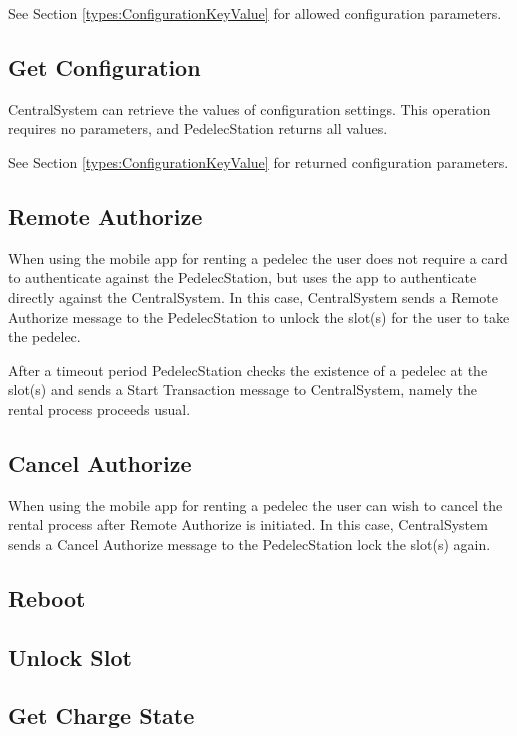  See Section \ref{types:ConfigurationKeyValue} for allowed configuration parameters.

\subsection{Get Configuration}

CentralSystem can retrieve the values of configuration settings. This operation requires no parameters, and PedelecStation returns all values.

 See Section \ref{types:ConfigurationKeyValue} for returned configuration parameters.

\subsection{Remote Authorize}

When using the mobile app for renting a pedelec the user does not require a card to authenticate against the PedelecStation, but uses the app to authenticate directly against the CentralSystem. In this case, CentralSystem sends a Remote Authorize message to the PedelecStation to unlock the slot(s) for the user to take the pedelec. 

After a timeout period PedelecStation checks the existence of a pedelec at the slot(s) and sends a Start Transaction message to CentralSystem, namely the rental process proceeds usual.

\subsection{Cancel Authorize}

When using the mobile app for renting a pedelec the user can wish to cancel the rental process after Remote Authorize is initiated. In this case, CentralSystem sends a Cancel Authorize message to the PedelecStation lock the slot(s) again.

\subsection{Reboot}
\subsection{Unlock Slot}
\subsection{Get Charge State}